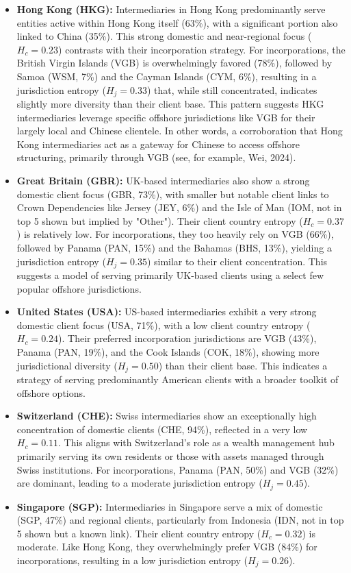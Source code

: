 \begin{itemize}
    \item \textbf{Hong Kong (HKG):} Intermediaries in Hong Kong predominantly serve entities active within Hong Kong itself (63\%), with a significant portion also linked to China (35\%). This strong domestic and near-regional focus ($H_c=0.23$) contrasts with their incorporation strategy. For incorporations, the British Virgin Islands (VGB) is overwhelmingly favored (78\%), followed by Samoa (WSM, 7\%) and the Cayman Islands (CYM, 6\%), resulting in a jurisdiction entropy ($H_j=0.33$) that, while still concentrated, indicates slightly more diversity than their client base. This pattern suggests HKG intermediaries leverage specific offshore jurisdictions like VGB for their largely local and Chinese clientele. In other words, a corroboration that Hong Kong intermediaries act as a gateway for Chinese to access offshore structuring, primarily through VGB (see, for example, Wei, 2024).

    \item \textbf{Great Britain (GBR):} UK-based intermediaries also show a strong domestic client focus (GBR, 73\%), with smaller but notable client links to Crown Dependencies like Jersey (JEY, 6\%) and the Isle of Man (IOM, not in top 5 shown but implied by "Other"). Their client country entropy ($H_c=0.37$) is relatively low. For incorporations, they too heavily rely on VGB (66\%), followed by Panama (PAN, 15\%) and the Bahamas (BHS, 13\%), yielding a jurisdiction entropy ($H_j=0.35$) similar to their client concentration. This suggests a model of serving primarily UK-based clients using a select few popular offshore jurisdictions.

    \item \textbf{United States (USA):} US-based intermediaries exhibit a very strong domestic client focus (USA, 71\%), with a low client country entropy ($H_c=0.24$). Their preferred incorporation jurisdictions are VGB (43\%), Panama (PAN, 19\%), and the Cook Islands (COK, 18\%), showing more jurisdictional diversity ($H_j=0.50$) than their client base. This indicates a strategy of serving predominantly American clients with a broader toolkit of offshore options.

    \item \textbf{Switzerland (CHE):} Swiss intermediaries show an exceptionally high concentration of domestic clients (CHE, 94\%), reflected in a very low $H_c=0.11$. This aligns with Switzerland's role as a wealth management hub primarily serving its own residents or those with assets managed through Swiss institutions. For incorporations, Panama (PAN, 50\%) and VGB (32\%) are dominant, leading to a moderate jurisdiction entropy ($H_j=0.45$).

    \item \textbf{Singapore (SGP):} Intermediaries in Singapore serve a mix of domestic (SGP, 47\%) and regional clients, particularly from Indonesia (IDN, not in top 5 shown but a known link). Their client country entropy ($H_c=0.32$) is moderate. Like Hong Kong, they overwhelmingly prefer VGB (84\%) for incorporations, resulting in a low jurisdiction entropy ($H_j=0.26$).
\end{itemize}

